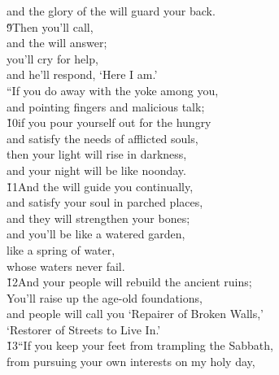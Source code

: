 \begin{poetry}
\poemll    and the glory of the  will guard your back. \\
\poeml \v{9}Then you'll call, \\
\poemll    and the  will answer; \\
\poeml you'll cry for help, \\
\poemll    and he'll respond, `Here I am.' \\
\poeml ``If you do away with the yoke among you, \\
\poemll    and pointing fingers and malicious talk; \\
\poeml \v{10}if you pour yourself out for the hungry \\
\poemll    and satisfy the needs of afflicted souls, \\
\poeml then your light will rise in darkness, \\
\poemll    and your night will be like noonday. \\
\poeml \v{11}And the  will guide you continually, \\
\poemll    and satisfy your soul in parched places, \\
\poemlll       and they will strengthen your bones; \\
\poeml and you'll be like a watered garden, \\
\poemll    like a spring of water, \\
\poemlll       whose waters never fail. \\
\poeml \v{12}And your people will rebuild the ancient ruins; \\
\poemll    You'll raise up the age-old foundations, \\
\poeml and people will call you `Repairer of Broken Walls,' \\
\poemll    `Restorer of Streets to Live In.' \\
\poeml \v{13}``If you keep your feet from trampling the Sabbath, \\
\poemll    from pursuing your own interests on my holy day, \\

\end{poetry}
